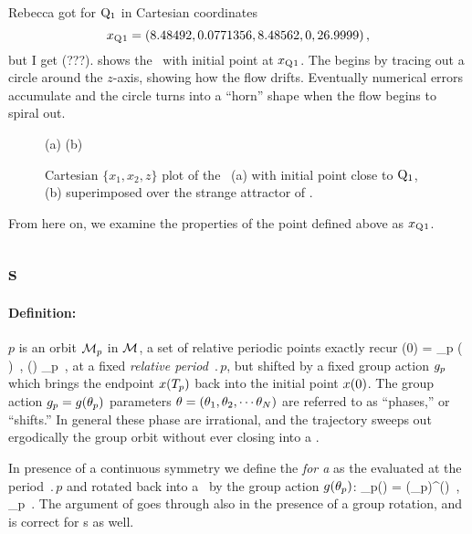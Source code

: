 {Rebecca got for
$\mathrm{Q}_{1}$ in Cartesian coordinates
\[x_{\mathrm{Q}_{}1} = (8.48492,0.0771356,8.48562,0,26.9999)
\,,
\]
but I get (???).
 shows the \cLf\ with initial point at
$x_{\mathrm{Q}_{}1}$. The {\reqv} begins by tracing out a circle
around the $z$-axis, showing how the flow drifts. Eventually
numerical errors accumulate and the circle turns into a
``horn'' shape when the flow begins to spiral out.
\begin{figure}[h]
\begin{center}
(a) %
(b) %
\end{center}
\caption{
Cartesian $\{x_1,x_2,z\}$ plot of the \cLf\ (a) with initial point
close to $\mathrm{Q}_{1}$, (b) superimposed over the strange attractor of
.
    }
\label{fig:CLERelEqui}
\end{figure}

From
here on, we examine the properties of the point defined
above as $x_{\mathrm{Q}_{}1}$.

\subsection{\Rpo s}
\label{SF:rpos}

\paragraph{Definition:
           \Rpo}
$p$ is an orbit ${\cal M}_p$ in {\statesp} ${\cal M}$, a set of relative periodic
points exactly recur
\beq
\ssp (0) = \LieEl_p \ssp ( )
    \,,\qquad
\ssp (\tau) \in \pS_p
    \,,
\label{RPOrelper1}
\eeq
at a fixed {\em relative period} $\period{p}$, but
shifted by a fixed group action ${g_p}$
which brings the endpoint $x ({T_{p}} ) $
back into the initial point $x (0) $.
The group action ${g_p}=g({\bf \theta}_p)$ parameters  %
${\bf \theta} = ({\bf \theta}_1,{\bf \theta}_2,\cdots{\bf \theta}_N)$
are referred to as ``phases,'' or ``shifts.''
%
In general these phase are irrational, and the trajectory  %
sweeps out ergodically the group orbit without ever closing
into a \po.

In presence of a continuous symmetry we define the
\emph{{\FloquetM} for a \rpo} as the {\jacobianM} evaluated
at the period $\period{p}$ and rotated back into a \po\ by the
group action $g({\bf \theta}_p)$:
\beq
 \jMps_p(\ssp) = \LieEl(\gSpace_p)\jMps^(\ssp)
    \,,\qquad
\ssp  \in \pS_p
\,.
The argument of  goes through also in
the presence of a group rotation,
and  is correct for \rpo s as well.

}
